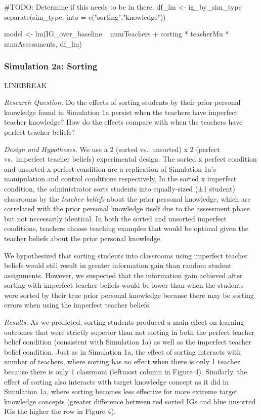\documentclass[10pt, letterpaper]{apa6}
\newenvironment{CodeChunk}{}{}
\begin{document}
\begin{CodeChunk}
\begin{CodeInput}
#TODO: Determine if this needs to be in there.
df_lm <- ig_by_sim_type %
  separate(sim_type, into = c("sorting","knowledge"))

model <- lm(IG_over_baseline ~ numTeachers + sorting * teacherMu * numAssessments, df_lm)
\end{CodeInput}
\end{CodeChunk}

\subsubsection{Simulation 2a: Sorting}\label{simulation-2a-sorting}

LINEBREAK

\emph{Research Question. } Do the effects of sorting students by their
prior personal knowledge found in Simulation 1a persist when the
teachers have imperfect teacher knowledge? How do the effects compare
with when the teachers have perfect teacher beliefs?

\emph{Design and Hypotheses. } We use a 2 (sorted vs.~unsorted) x 2
(perfect vs.~imperfect teacher beliefs) experimental design. The sorted
x perfect condition and unsorted x perfect condition are a replication
of Simulation 1a's manipulation and control conditions respectively. In
the sorted x imperfect condition, the administrator sorts students into
equally-sized (±1 student) classrooms by the \emph{teacher beliefs}
about the prior personal knowledge, which are correlated with the prior
personal knowledge itself due to the assessment phase but not
necessarily identical. In both the sorted and unsorted imperfect
conditions, teachers choose teaching examples that would be optimal
given the teacher beliefs about the prior personal knowledge.

We hypothesized that sorting students into classrooms using imperfect
teacher beliefs would still result in greater information gain than
random student assignments. However, we suspected that the information
gain achieved after sorting with imperfect teacher beliefs would be
lower than when the students were sorted by their true prior personal
knowledge because there may be sorting errors when using the imperfect
teacher beliefs.

\emph{Results. } As we predicted, sorting students produced a main
effect on learning outcomes that were strictly superior than not sorting
in both the perfect teacher belief condition (consistent with Simulation
1a) as well as the imperfect teacher belief condition. Just as in
Simulation 1a, the effect of sorting interacts with number of teachers,
where sorting has no effect when there is only 1 teacher because there
is only 1 classroom (leftmost column in Figure 4). Similarly, the effect
of sorting also interacts with target knowledge concept as it did in
Simulation 1a, where sorting becomes less effective for more extreme
target knowledge concepts (greater difference between red sorted IGs and
blue unsorted IGs the higher the row in Figure 4).
\end{document}
